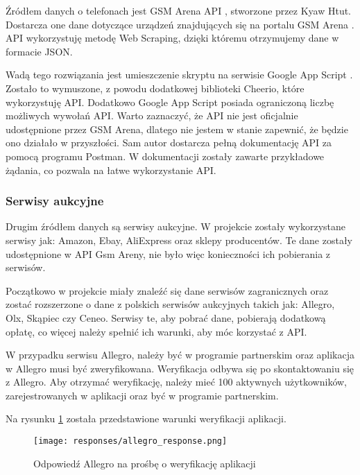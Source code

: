 Źródłem danych o telefonach jest GSM Arena API \cite{gsm_arena_api}, stworzone przez Kyaw Htut. Dostarcza one dane dotyczące urządzeń znajdujących się na portalu \linebreak GSM Arena \cite{gsm_arena}. API wykorzystuję metodę Web Scraping, dzięki któremu otrzymujemy dane w formacie JSON.

Wadą tego rozwiązania jest umieszczenie skryptu na serwisie \linebreak Google App Script \cite{google_app_script}. Zostało to wymuszone, z powodu dodatkowej biblioteki Cheerio, które wykorzystuję API. Dodatkowo Google App Script posiada ograniczoną liczbę możliwych wywołań API. Warto zaznaczyć, że API nie jest oficjalnie udostępnione przez GSM Arena, dlatego nie jestem w stanie zapewnić, że będzie ono działało w przyszłości. Sam autor dostarcza pełną dokumentację API za pomocą programu Postman. W dokumentacji \cite{gsm_arena_api_reference} zostały zawarte przykładowe żądania, co pozwala na łatwe wykorzystanie API.

\subsubsection{Serwisy aukcyjne}
Drugim źródłem danych są serwisy aukcyjne. W projekcie zostały wykorzystane serwisy jak: Amazon, Ebay, AliExpress oraz sklepy producentów. Te dane zostały udostępnione w API Gsm Areny, nie było więc konieczności ich pobierania z serwisów.

Początkowo w projekcie miały znaleźć się dane serwisów zagranicznych  oraz zostać rozszerzone o dane z polskich serwisów aukcyjnych takich jak: Allegro, Olx, Skąpiec czy Ceneo. Serwisy te, aby pobrać dane, pobierają dodatkową opłatę, co więcej należy spełnić ich warunki, aby móc korzystać z API.

W przypadku serwisu Allegro, należy być w programie partnerskim oraz aplikacja w Allegro musi być zweryfikowana. Weryfikacja odbywa się po skontaktowaniu się z Allegro. Aby otrzymać weryfikację, należy mieć 100 aktywnych użytkowników, zarejestrowanych w aplikacji oraz być w programie partnerskim.

Na rysunku \ref*{allegro_verification} została przedstawione warunki weryfikacji aplikacji.

\begin{figure}[H]
    \centering
    \texttt{[image: responses/allegro\_response.png]}
    \caption{Odpowiedź Allegro na prośbę o weryfikację aplikacji}
    \label{allegro_verification}
\end{figure}

